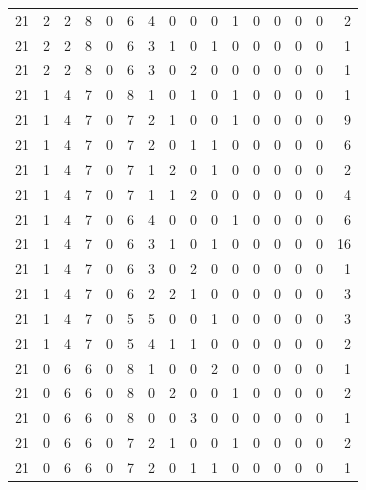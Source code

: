 \begin{appendix}
{\begin{longtable}{lrrrrrrrrrrrrrrr}
    21        & 2  & 2  & 8  & 0  & 6  & 4  & 0  & 0  & 0  & 1  & 0  & 0   & 0   & 0   & 2    \\
    21        & 2  & 2  & 8  & 0  & 6  & 3  & 1  & 0  & 1  & 0  & 0  & 0   & 0   & 0   & 1    \\
    21        & 2  & 2  & 8  & 0  & 6  & 3  & 0  & 2  & 0  & 0  & 0  & 0   & 0   & 0   & 1    \\
    21        & 1  & 4  & 7  & 0  & 8  & 1  & 0  & 1  & 0  & 1  & 0  & 0   & 0   & 0   & 1    \\
    21        & 1  & 4  & 7  & 0  & 7  & 2  & 1  & 0  & 0  & 1  & 0  & 0   & 0   & 0   & 9    \\
    21        & 1  & 4  & 7  & 0  & 7  & 2  & 0  & 1  & 1  & 0  & 0  & 0   & 0   & 0   & 6    \\
    21        & 1  & 4  & 7  & 0  & 7  & 1  & 2  & 0  & 1  & 0  & 0  & 0   & 0   & 0   & 2    \\
    21        & 1  & 4  & 7  & 0  & 7  & 1  & 1  & 2  & 0  & 0  & 0  & 0   & 0   & 0   & 4    \\
    21        & 1  & 4  & 7  & 0  & 6  & 4  & 0  & 0  & 0  & 1  & 0  & 0   & 0   & 0   & 6    \\
    21        & 1  & 4  & 7  & 0  & 6  & 3  & 1  & 0  & 1  & 0  & 0  & 0   & 0   & 0   & 16   \\
    21        & 1  & 4  & 7  & 0  & 6  & 3  & 0  & 2  & 0  & 0  & 0  & 0   & 0   & 0   & 1    \\
    21        & 1  & 4  & 7  & 0  & 6  & 2  & 2  & 1  & 0  & 0  & 0  & 0   & 0   & 0   & 3    \\
    21        & 1  & 4  & 7  & 0  & 5  & 5  & 0  & 0  & 1  & 0  & 0  & 0   & 0   & 0   & 3    \\
    21        & 1  & 4  & 7  & 0  & 5  & 4  & 1  & 1  & 0  & 0  & 0  & 0   & 0   & 0   & 2    \\
    21        & 0  & 6  & 6  & 0  & 8  & 1  & 0  & 0  & 2  & 0  & 0  & 0   & 0   & 0   & 1    \\
    21        & 0  & 6  & 6  & 0  & 8  & 0  & 2  & 0  & 0  & 1  & 0  & 0   & 0   & 0   & 2    \\
    21        & 0  & 6  & 6  & 0  & 8  & 0  & 0  & 3  & 0  & 0  & 0  & 0   & 0   & 0   & 1    \\
    21        & 0  & 6  & 6  & 0  & 7  & 2  & 1  & 0  & 0  & 1  & 0  & 0   & 0   & 0   & 2    \\
    21        & 0  & 6  & 6  & 0  & 7  & 2  & 0  & 1  & 1  & 0  & 0  & 0   & 0   & 0   & 1    \\

\end{longtable}}
\end{appendix}
